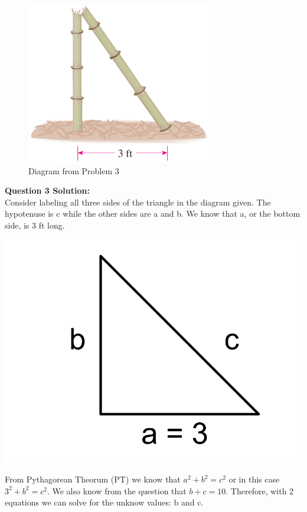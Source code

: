 \documentclass[12pt]{book}
\begin{document}
\begin{enumerate}
\begin{figure}[h]
\centering
\includegraphics[scale = 0.7]{bamboo.png}
\caption{Diagram from Problem 3}
\end{figure}

\vspace{0.2cm} 
\textbf{Question 3 Solution:}\\

Consider labeling all three sides of the triangle in the diagram given. The hypotenuse is c while the other sides are a and b. We know that a, or the bottom side, is 3 ft long.
\begin{center}
\includegraphics[scale = 0.2]{A1-3 Diagram.png}
\end{center}

From Pythagorean Theorum (PT) we know that $a^2 + b^2 = c^2$ or in this case $3^2 + b^2 = c^2$. 
We also know from the question that $b+c = 10$. Therefore, with 2 equations we can solve for the unknow values: b and c.


\end{enumerate}
\end{document}
